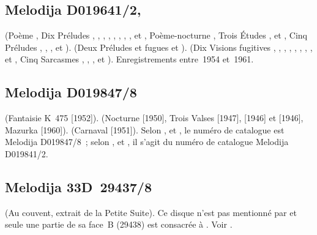\subsection{Melodija D019641/2, }

\Scriabine{} (Poème , Dix Préludes  , 
,  ,  , 
,  ,  , 
,   et  , Poème-nocturne
, Trois Études  ,   et
 , Cinq Préludes  , 
,  ,   et 
).
\Chostakovitch{} (Deux Préludes et fugues   et 
).
\Prokofiev{} (Dix Visions fugitives  , 
,  ,  , 
,  ,  , 
,   et  , Cinq Sarcasmes
 ,  ,  , 
 et  ).
Enregistrements entre~1954 et~1961.

\subsection{Melodija D019847/8}

\Mozart{} (Fantaisie K~475 [1952]).
\Chopin{} (Nocturne   [1950], Trois Valses 
 [1947],   [1946] et  
[1946], Mazurka   [1960]).
\Schumann{} (Carnaval  [1951]).
Selon \citet{Malik}, \citet{Masuda} et \citet{Recordssu}, le numéro de
catalogue est Melodija D019847/8~; selon \citet{Nikonovich11}, \citet{Rossi}
et \citet{White}, il s'agit du numéro de catalogue Melodija D019841/2.

\subsection{Melodija 33D~29437/8}

\Borodine{} (Au couvent, extrait de la Petite Suite).
Ce disque n'est pas mentionné par \INikonovich{}
\citep[voir][]{Nikonovich11} et seule une partie de sa face~B (29438) est
consacrée à \VSofronitsky{}.
Voir \citet{Recordssu}.

